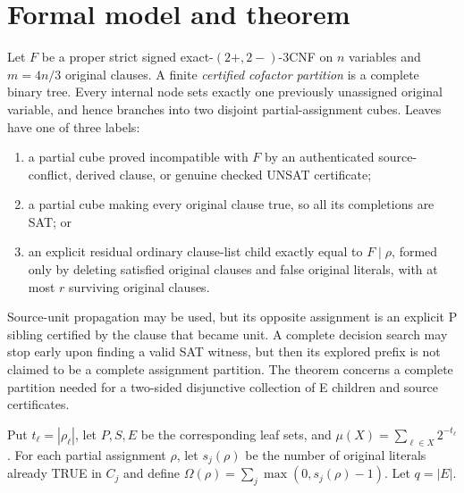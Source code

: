 \documentclass[10pt]{article}
\begin{document}
\section{Formal model and theorem}
Let $F$ be a proper strict signed exact-$(2+,2-)$-3CNF on $n$ variables and $m=4n/3$ original clauses. A finite \emph{certified cofactor partition} is a complete binary tree. Every internal node sets exactly one previously unassigned original variable, and hence branches into two disjoint partial-assignment cubes. Leaves have one of three labels:
\begin{enumerate}
\item[P.] a partial cube proved incompatible with $F$ by an authenticated source-conflict, derived clause, or genuine checked UNSAT certificate;
\item[S.] a partial cube making every original clause true, so all its completions are SAT; or
\item[E.] an explicit residual ordinary clause-list child exactly equal to $F\mid\rho$, formed only by deleting satisfied original clauses and false original literals, with at most $r$ surviving original clauses.
\end{enumerate}
Source-unit propagation may be used, but its opposite assignment is an explicit P sibling certified by the clause that became unit. A complete decision search may stop early upon finding a valid SAT witness, but then its explored prefix is not claimed to be a complete assignment partition. The theorem concerns a complete partition needed for a two-sided disjunctive collection of E children and source certificates.

Put $t_\ell=|\rho_\ell|$, let $P,S,E$ be the corresponding leaf sets, and $\mu(X)=\sum_{\ell\in X}2^{-t_\ell}$. For each partial assignment $\rho$, let $s_j(\rho)$ be the number of original literals already TRUE in $C_j$ and define $\Omega(\rho)=\sum_j\max(0,s_j(\rho)-1)$. Let $q=|E|$.
\end{document}
